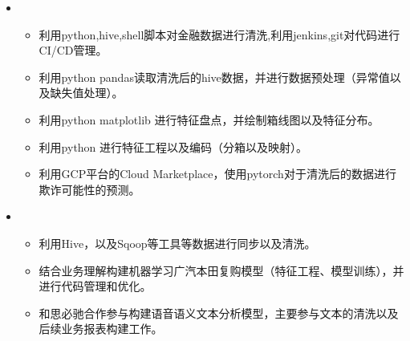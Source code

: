 
  \begin{itemize}[leftmargin=*]
         \item
           {\small
      \begin{itemize}
      \item 利用python,hive,shell脚本对金融数据进行清洗,利用jenkins,git对代码进行CI/CD管理。
       \item 利用python pandas读取清洗后的hive数据，并进行数据预处理（异常值以及缺失值处理）。
		\item 利用python matplotlib 进行特征盘点，并绘制箱线图以及特征分布。
		\item 利用python 进行特征工程以及编码（分箱以及映射）。
          \item 利用GCP平台的Cloud Marketplace，使用pytorch对于清洗后的数据进行欺诈可能性的预测。
            \end{itemize}
           }
       \item
           {\small
      \begin{itemize}
      \item 利用Hive，以及Sqoop等工具等数据进行同步以及清洗。
         \item 结合业务理解构建机器学习广汽本田复购模型（特征工程、模型训练），并进行代码管理和优化。
          \item 和思必驰合作参与构建语音语义文本分析模型，主要参与文本的清洗以及后续业务报表构建工作。
            \end{itemize}

             }
  \end{itemize}

